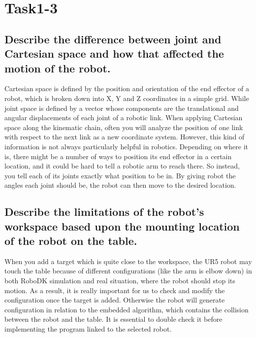 \documentclass[letterpaper,11pt]{texMemo} %
\begin{document}
\maketitle %



\doublespacing

\section{Task1-3}

\subsection{Describe the difference between joint and Cartesian space and how that affected the	motion of the robot.}

Cartesian space is defined by the position and orientation of the end effector of a robot, which is broken down into X, Y and Z coordinates in a simple grid. While joint space is defined by a vector whose components are the translational and angular displacements of each joint of a robotic link. When applying Cartesian space along the kinematic chain, often you will analyze the position of one link with respect to the next link as a new coordinate system. However, this kind of information is not always particularly helpful in robotics. Depending on where it is, there might be a number of ways to position its end effector in a certain location, and it could be hard to tell a robotic arm to reach there. So instead, you tell each of its joints exactly what position to be in. By giving robot the angles each joint should be, the robot can then move to the desired location. 

\subsection{Describe the limitations of the robot’s workspace based upon the mounting location of the robot on the table.}

When you add a target which is quite close to the workspace, the UR5 robot may touch the table because of different configurations (like the arm is elbow down) in both RoboDK simulation and real situation, where the robot should stop its motion. As a result, it is really important for us to check and modify the configuration once the target is added. Otherwise the robot will generate configuration in relation to the embedded algorithm, which contains the collision between the robot and the table. It is essential to double check it before implementing the program linked to the selected robot.
\end{document}
